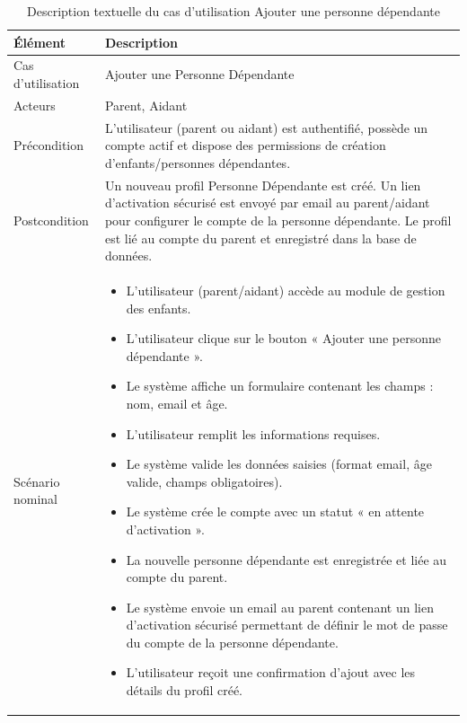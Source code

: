 \small
\renewcommand{\arraystretch}{1.1}
\setlength{\parskip}{0pt}
\begin{longtable}{|p{}|>{\raggedright\arraybackslash}p{}|}
\caption{Description textuelle du cas d'utilisation Ajouter une personne dépendante} \\
\hline
\textbf{Élément} & \textbf{Description} \\ \hline
\endfirsthead

\endhead

\hline
\endlastfoot

Cas d'utilisation & Ajouter une Personne Dépendante \\ \hline

Acteurs & Parent, Aidant \\ \hline

Précondition & L'utilisateur (parent ou aidant) est authentifié, possède un compte actif et dispose des permissions de création d'enfants/personnes dépendantes. \\ \hline

Postcondition & Un nouveau profil Personne Dépendante est créé. Un lien d'activation sécurisé est envoyé par email au parent/aidant pour configurer le compte de la personne dépendante. Le profil est lié au compte du parent et enregistré dans la base de données. \\ \hline

Scénario nominal &
\begin{itemize}[nosep, leftmargin=*]
\item L'utilisateur (parent/aidant) accède au module de gestion des enfants.
\item L'utilisateur clique sur le bouton « Ajouter une personne dépendante ».
\item Le système affiche un formulaire contenant les champs : nom, email et âge.
\item L'utilisateur remplit les informations requises.
\item Le système valide les données saisies (format email, âge valide, champs obligatoires).
\item Le système crée le compte avec un statut « en attente d'activation ».
\item La nouvelle personne dépendante est enregistrée et liée au compte du parent.
\item Le système envoie un email au parent contenant un lien d'activation sécurisé permettant de définir le mot de passe du compte de la personne dépendante.
\item L'utilisateur reçoit une confirmation d'ajout avec les détails du profil créé.
\end{itemize}
\\ \hline


\end{longtable}
